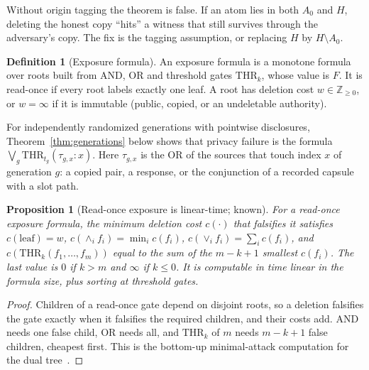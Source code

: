 \documentclass[pdflatex,sn-mathphys-num]{sn-jnl}
\theoremstyle{plain}
\newtheorem{proposition}[theorem]{Proposition}
\theoremstyle{definition}
\newtheorem{definition}[theorem]{Definition}
\begin{document}
Without origin tagging the theorem is false. If an atom lies in both $A_0$ and $H$, deleting the honest copy ``hits'' a witness that still survives through the adversary's copy. The fix is the tagging assumption, or replacing $H$ by $H\setminus A_0$.

\begin{definition}[Exposure formula]
An exposure formula is a monotone formula over roots built from AND, OR and threshold gates $\mathrm{THR}_k$, whose value is $F$. It is read-once if every root labels exactly one leaf. A root has deletion cost $w\in\mathbb{Z}_{\ge0}$, or $w=\infty$ if it is immutable (public, copied, or an undeletable authority).
\end{definition}

For independently randomized generations with pointwise disclosures, Theorem~\ref{thm:generations} below shows that privacy failure is the formula $\bigvee_g\mathrm{THR}_{t_g}(\tau_{g,x}:x)$. Here $\tau_{g,x}$ is the OR of the sources that touch index $x$ of generation $g$: a copied pair, a response, or the conjunction of a recorded capsule with a slot path.

\begin{proposition}[Read-once exposure is linear-time; known]\label{prop:readonce}
For a read-once exposure formula, the minimum deletion cost $c(\cdot)$ that falsifies it satisfies $c(\text{leaf})=w$, $c(\wedge_i f_i)=\min_i c(f_i)$, $c(\vee_i f_i)=\sum_i c(f_i)$, and $c(\mathrm{THR}_k(f_1,\dots,f_m))$ equal to the sum of the $m-k+1$ smallest $c(f_i)$. The last value is $0$ if $k>m$ and $\infty$ if $k\le0$. It is computable in time linear in the formula size, plus sorting at threshold gates.
\end{proposition}
\begin{proof}
Children of a read-once gate depend on disjoint roots, so a deletion falsifies the gate exactly when it falsifies the required children, and their costs add. AND needs one false child, OR needs all, and $\mathrm{THR}_k$ of $m$ needs $m-k+1$ false children, cheapest first. This is the bottom-up minimal-attack computation for the dual tree~\cite{mauw2005,lopuhaa2022}.
\end{proof}
\end{document}
